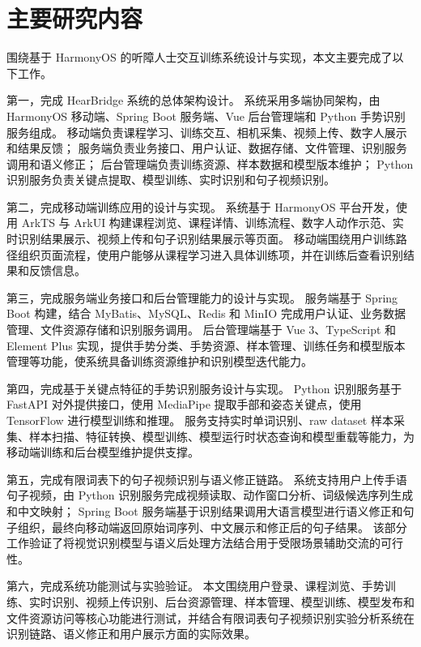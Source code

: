 
\section{主要研究内容}

围绕基于 HarmonyOS 的听障人士交互训练系统设计与实现，本文主要完成了以下工作。

第一，完成 HearBridge 系统的总体架构设计。
系统采用多端协同架构，由 HarmonyOS 移动端、Spring Boot 服务端、Vue 后台管理端和 Python 手势识别服务组成。
移动端负责课程学习、训练交互、相机采集、视频上传、数字人展示和结果反馈；
服务端负责业务接口、用户认证、数据存储、文件管理、识别服务调用和语义修正；
后台管理端负责训练资源、样本数据和模型版本维护；
Python 识别服务负责关键点提取、模型训练、实时识别和句子视频识别。

第二，完成移动端训练应用的设计与实现。
系统基于 HarmonyOS 平台开发，使用 ArkTS 与 ArkUI 构建课程浏览、课程详情、训练流程、数字人动作示范、实时识别结果展示、视频上传和句子识别结果展示等页面。
移动端围绕用户训练路径组织页面流程，使用户能够从课程学习进入具体训练项，并在训练后查看识别结果和反馈信息。

第三，完成服务端业务接口和后台管理能力的设计与实现。
服务端基于 Spring Boot 构建，结合 MyBatis、MySQL、Redis 和 MinIO 完成用户认证、业务数据管理、文件资源存储和识别服务调用。
后台管理端基于 Vue 3、TypeScript 和 Element Plus 实现，提供手势分类、手势资源、样本管理、训练任务和模型版本管理等功能，使系统具备训练资源维护和识别模型迭代能力。

第四，完成基于关键点特征的手势识别服务设计与实现。
Python 识别服务基于 FastAPI 对外提供接口，使用 MediaPipe 提取手部和姿态关键点，使用 TensorFlow 进行模型训练和推理。
服务支持实时单词识别、raw dataset 样本采集、样本扫描、特征转换、模型训练、模型运行时状态查询和模型重载等能力，为移动端训练和后台模型维护提供支撑。

第五，完成有限词表下的句子视频识别与语义修正链路。
系统支持用户上传手语句子视频，由 Python 识别服务完成视频读取、动作窗口分析、词级候选序列生成和中文映射；
Spring Boot 服务端基于识别结果调用大语言模型进行语义修正和句子组织，最终向移动端返回原始词序列、中文展示和修正后的句子结果。
该部分工作验证了将视觉识别模型与语义后处理方法结合用于受限场景辅助交流的可行性。

第六，完成系统功能测试与实验验证。
本文围绕用户登录、课程浏览、手势训练、实时识别、视频上传识别、后台资源管理、样本管理、模型训练、模型发布和文件资源访问等核心功能进行测试，并结合有限词表句子视频识别实验分析系统在识别链路、语义修正和用户展示方面的实际效果。
